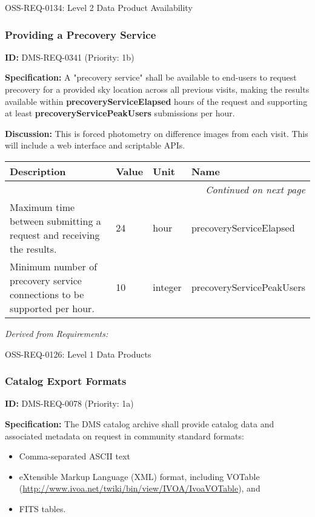 \documentclass[SE,toc,lsstdraft]{lsstdoc}
\makeatletter
\newcommand{\paramname}[1]{\hspace{0pt}#1}
\newcommand{\unitname}[1]{\hspace{0pt}#1}
\newenvironment{parameters}[0]{%
\setlength\LTleft{0pt}
\setlength\LTright{\fill}
\begin{small}
\begin{longtable}[]{|p{0.49\textwidth}|l|p{0.6in}|p{1.70in}@{}|}

\hline \textbf{Description} & \textbf{Value} & \textbf{Unit} & \textbf{Name} \\ \hline
\endhead

\hline \multicolumn{4}{r}{\emph{Continued on next page}} \\
\endfoot

\hline\hline
\endlastfoot
}{%
\hline
\end{longtable}
\end{small}
}
\makeatother
\begin{document}
OSS-REQ-0134:
Level 2 Data Product Availability \newline

\subsubsection{Providing a Precovery Service}

\label{DMS-REQ-0341}
\textbf{ID:} DMS-REQ-0341 (Priority: 1b)

\textbf{Specification:} A "precovery service" shall be available to end-users to request precovery for a provided sky location across all previous visits, making the results available within \textbf{precoveryServiceElapsed} hours of the request and supporting at least\textbf{ precoveryServicePeakUsers} submissions per hour.

\textbf{Discussion:} This is forced photometry on difference images from each visit. This will include a web interface and scriptable APIs.

\begin{parameters}
Maximum time between submitting a request and receiving the results.
&
24
&
\unitname{%
hour
}
&
\paramname{%
precoveryServiceElapsed
} \\\hline
Minimum number of precovery service connections to be supported per hour.
&
10
&
\unitname{%
integer
}
&
\paramname{%
precoveryServicePeakUsers
} \\\hline
\end{parameters}

\emph{Derived from Requirements:}

OSS-REQ-0126:
Level 1 Data Products \newline

\subsubsection{Catalog Export Formats}

\label{DMS-REQ-0078}
\textbf{ID:} DMS-REQ-0078 (Priority: 1a)

\textbf{Specification:} The DMS catalog archive shall provide catalog data and associated metadata on request in community standard formats:
\begin{itemize}
\item Comma-separated ASCII text
\item eXtensible Markup Language (XML) format, including VOTable
   (\url{http://www.ivoa.net/twiki/bin/view/IVOA/IvoaVOTable}), and
\item FITS tables.
\end{itemize}
\end{document}
